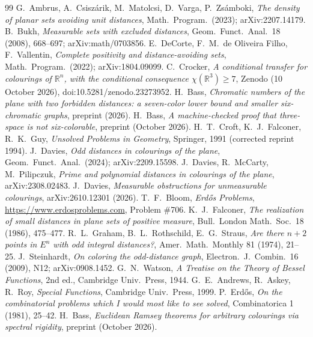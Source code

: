 \documentclass[11pt]{amsart}
\theoremstyle{definition}
\newcommand{\R}{\mathbb{R}}
\begin{document}
\begin{thebibliography}{99}
 G.~Ambrus, A.~Csisz\'arik, M.~Matolcsi, D.~Varga, P.~Zs\'amboki, \emph{The density of planar sets avoiding unit distances}, Math.\ Program.\ (2023); arXiv:2207.14179.
 B.~Bukh, \emph{Measurable sets with excluded distances}, Geom.\ Funct.\ Anal.\ 18 (2008), 668--697; arXiv:math/0703856.
 E.~DeCorte, F.~M.~de Oliveira Filho, F.~Vallentin, \emph{Complete positivity and distance-avoiding sets}, Math.\ Program.\ (2022); arXiv:1804.09099.
 C.~Crocker, \emph{A conditional transfer for colourings of $\R^n$, with the conditional consequence $\chi(\R^3)\ge7$}, Zenodo (10 October 2026), doi:10.5281/zenodo.23273952.
 H.~Bass, \emph{Chromatic numbers of the plane with two forbidden distances: a seven-color lower bound and smaller six-chromatic graphs}, preprint (2026).
 H.~Bass, \emph{A machine-checked proof that three-space is not six-colorable}, preprint (October 2026).
 H.~T.~Croft, K.~J.~Falconer, R.~K.~Guy, \emph{Unsolved Problems in Geometry}, Springer, 1991 (corrected reprint 1994).
 J.~Davies, \emph{Odd distances in colourings of the plane}, Geom.\ Funct.\ Anal.\ (2024); arXiv:2209.15598.
 J.~Davies, R.~McCarty, M.~Pilipczuk, \emph{Prime and polynomial distances in colourings of the plane}, arXiv:2308.02483.
 J.~Davies, \emph{Measurable obstructions for unmeasurable colourings}, arXiv:2610.12301 (2026).
 T.~F.~Bloom, \emph{Erd\H{o}s Problems}, \url{https://www.erdosproblems.com}, Problem \#706.
 K.~J.~Falconer, \emph{The realization of small distances in plane sets of positive measure}, Bull.\ London Math.\ Soc.\ 18 (1986), 475--477.
 R.~L.~Graham, B.~L.~Rothschild, E.~G.~Straus, \emph{Are there $n+2$ points in $E^n$ with odd integral distances?}, Amer.\ Math.\ Monthly 81 (1974), 21--25.
 J.~Steinhardt, \emph{On coloring the odd-distance graph}, Electron.\ J.\ Combin.\ 16 (2009), N12; arXiv:0908.1452.
 G.~N.~Watson, \emph{A Treatise on the Theory of Bessel Functions}, 2nd ed., Cambridge Univ.\ Press, 1944.
 G.~E.~Andrews, R.~Askey, R.~Roy, \emph{Special Functions}, Cambridge Univ.\ Press, 1999.
 P.~Erd\H{o}s, \emph{On the combinatorial problems which I would most like to see solved}, Combinatorica 1 (1981), 25--42.
 H.~Bass, \emph{Euclidean Ramsey theorems for arbitrary colourings via spectral rigidity}, preprint (October 2026).

\end{thebibliography}
\end{document}
